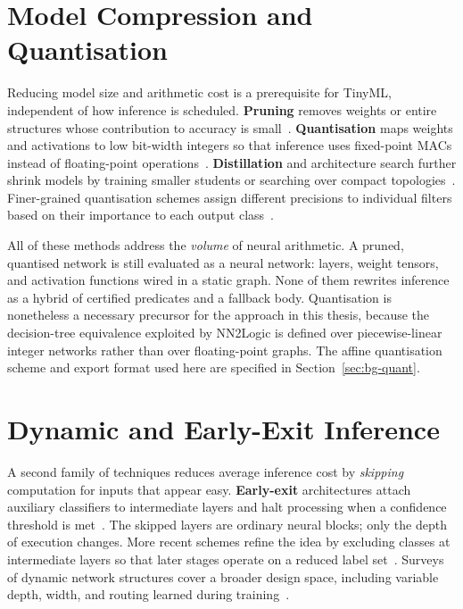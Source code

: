 \section{Model Compression and Quantisation}
\label{sec:rw-compression}

Reducing model size and arithmetic cost is a prerequisite for TinyML, independent of how inference is scheduled.
\textbf{Pruning} removes weights or entire structures whose contribution to accuracy is small~\cite{han2015deepcompression}.
\textbf{Quantisation} maps weights and activations to low bit-width integers so that inference uses fixed-point \acp{MAC} instead of floating-point operations~\cite{jacob2018quantization}.
\textbf{Distillation} and architecture search further shrink models by training smaller students or searching over compact topologies~\cite{lin2020mcunet,han2015deepcompression}.
Finer-grained quantisation schemes assign different precisions to individual filters based on their importance to each output class~\cite{sun2023classquant}.

All of these methods address the \emph{volume} of neural arithmetic.
A pruned, quantised network is still evaluated as a neural network: layers, weight tensors, and activation functions wired in a static graph.
None of them rewrites inference as a hybrid of certified predicates and a fallback body.
Quantisation is nonetheless a necessary precursor for the approach in this thesis, because the decision-tree equivalence exploited by NN2Logic is defined over piecewise-linear integer networks rather than over floating-point graphs.
The affine quantisation scheme and export format used here are specified in Section~\ref{sec:bg-quant}.


\section{Dynamic and Early-Exit Inference}
\label{sec:rw-earlyexit}

A second family of techniques reduces average inference cost by \emph{skipping} computation for inputs that appear easy.
\textbf{Early-exit} architectures attach auxiliary classifiers to intermediate layers and halt processing when a confidence threshold is met~\cite{teerapittayanon2016branchynet}.
The skipped layers are ordinary neural blocks; only the depth of execution changes.
More recent schemes refine the idea by excluding classes at intermediate layers so that later stages operate on a reduced label set~\cite{wang2024earlyexit}.
Surveys of dynamic network structures cover a broader design space, including variable depth, width, and routing learned during training~\cite{guo2025dynamic}.

